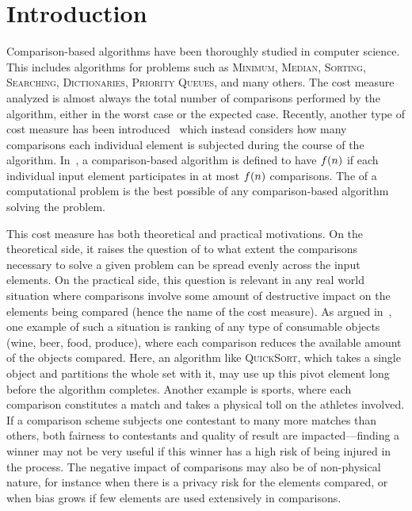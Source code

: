 \section{Introduction}
\label{sec:intro}

Comparison-based algorithms have been thoroughly studied in computer
science. This includes algorithms for problems such as
\textsc{Minimum}, \textsc{Median}, \textsc{Sorting},
\textsc{Searching}, \textsc{Dictionaries}, \textsc{Priority Queues},
and many others. The cost measure analyzed is almost always the total
number of comparisons performed by the algorithm, either in the worst
case or the expected case. Recently, another type of cost measure has
been introduced~\cite{afshani:fragile-ESA19} which instead considers
how many comparisons each individual element is subjected during the
course of the algorithm. In~\cite{afshani:fragile-ESA19}, a
comparison-based algorithm is defined to have {\em \frag} $f({n})$ if
each individual input element participates in at most $f({n})$
comparisons. The \frag of a computational problem is the best possible
\frag of any comparison-based algorithm solving the problem.

This cost measure has both theoretical and practical motivations. On
the theoretical side, it raises the question of to what extent the
comparisons necessary to solve a given problem can be spread evenly
across the input elements. On the practical side, this question is
relevant in any real world situation where comparisons involve some
amount of destructive impact on the elements being compared (hence the
name of the cost measure). As argued in~\cite{afshani:fragile-ESA19},
one example of such a situation is ranking of any type of consumable
objects (wine, beer, food, produce), where each comparison reduces the
available amount of the objects compared. Here, an algorithm like
\textsc{QuickSort}, which takes a single object and partitions the
whole set with it, may use up this pivot element long before the
algorithm completes. Another example is sports, where each comparison
constitutes a match and takes a physical toll on the athletes
involved. If a comparison scheme subjects one contestant to many more
matches than others, both fairness to contestants and quality of
result are impacted---finding a winner may not be very useful if this
winner has a high risk of being injured in the process. The negative
impact of comparisons may also be of non-physical nature, for instance
when there is a privacy risk for the elements compared, or when bias
grows if few elements are used extensively in comparisons.

